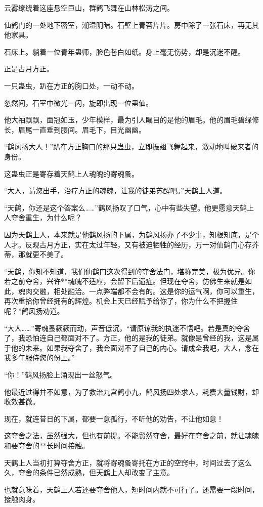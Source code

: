\begin{this_body}
云雾缭绕着这座悬空巨山，群鹤飞舞在山林松涛之间。

仙鹤门的一处地下密室，潮湿阴暗。石壁上青苔片片。房中除了一张石床，再无其他家具。

石床上。躺着一位青年蛊师，脸色苍白如纸。身上毫无伤势，却是沉迷不醒。

正是古月方正。

一只蛊虫，趴在方正的胸口处，一动不动。

忽然间，石室中微光一闪，旋即出现一位蛊仙。

他大袖飘飘，面冠如玉，少年模样，最为引人瞩目的是他的眉毛。他的眉毛碧绿修长，眉尾一直垂到腰间。眉毛下，目光幽幽。

“鹤风扬大人！”趴在方正胸口的那只蛊虫，立即振翅飞舞起来，激动地叫破来者的身份。

这蛊虫正是寄存着天鹤上人魂魄的寄魂蚤。

“大人，请您出手，治疗方正的魂魄，让我的徒弟苏醒吧。”天鹤上人道。

“天鹤，你还是这个答案么……”鹤风扬叹了口气，心中有些失望。他更愿意天鹤上人夺舍重生，为什么呢？

因为天鹤上人，本来就是他鹤风扬的下属，为鹤风扬办了不少事，知根知底，是个人才。反观古月方正，实在太过年轻，又有被迫牺牲的经历，万一对仙鹤门心存芥蒂，那就更不美了。

“天鹤，你知不知道，我们仙鹤门这次得到的夺舍法门，堪称完美，极为优异。你若之前夺舍，兴许**魂魄不适应，会留下后遗症。但现在夺舍，仿佛生来就是如此，魂肉交融，相处融洽。一点弊端都不会有的。这是你的运气啊，你可以重生，再次重拾你曾经拥有的辉煌。机会上天已经赋予给你了，你为什么不把握住呢？”鹤风扬劝道。

“大人……”寄魂蚤簌簌而动，声音低沉，“请原谅我的执迷不悟吧。若是真的夺舍了，我恐怕连自己都面对不了。方正，他的是我的徒弟。就像是曾经的我，这是属于他的未来。如果我夺舍了，我会面对不了自己的内心。请成全我吧，大人，念在我多年服侍您的份上。”

“你！”鹤风扬脸上涌现出一丝怒气。

他最近过得并不如意，为了救治九宫鹤小九，鹤风扬四处求人，耗费大量钱财，却收效甚微。

现在，就连昔日的下属，都要一意孤行，不听他的劝告，不让他如意！

这夺舍之法，虽然强大，但也有前提。不能贸然夺舍，最好在夺舍之前，就让魂魄和要夺舍的**长时间接触。

天鹤上人当初打算夺舍方正，就将寄魂蚤寄托在方正的空窍中，时间过去了这么久，夺舍的条件已然成熟，但天鹤上人却改变了主意。

也就意味着，天鹤上人若还要夺舍他人，短时间内就不可行了。还需要一段时间，接触肉身。


\end{this_body}

